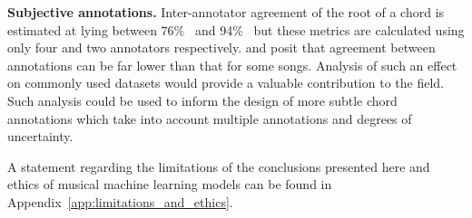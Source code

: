 \textbf{Subjective annotations.} Inter-annotator agreement of the root of a chord is estimated at lying between 76\%~\citep{AnnotatorAgreement76} and 94\%~\citep{RockHarmonyAnalysis94} but these metrics are calculated using only four and two annotators respectively. \citet{FourTimelyInsights} and \citet{UnderstandingSubjectivity} posit that agreement between annotations can be far lower than that for some songs. Analysis of such an effect on commonly used datasets would provide a valuable contribution to the field. Such analysis could be used to inform the design of more subtle chord annotations which take into account multiple annotations and degrees of uncertainty.

A statement regarding the limitations of the conclusions presented here and ethics of musical machine learning models can be found in Appendix~\ref{app:limitations_and_ethics}.

 